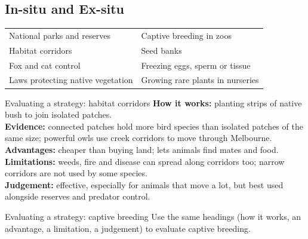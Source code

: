 \rcreset
{}

\label{theory:11}

\subsection{In-situ and Ex-situ}\label{sub:11.1}

\begin{ctab}
\begin{tabular}{|L{4.9cm}|L{4.9cm}|}
  \hline{} &  \\ \hline
  National parks and reserves & Captive breeding in zoos \\ \hline
  Habitat corridors & Seed banks \\ \hline
  Fox and cat control & Freezing eggs, sperm or tissue \\ \hline
  Laws protecting native vegetation & Growing rare plants in nurseries \\ \hline
\end{tabular}
\end{ctab}

\begin{workedex}{Evaluating a strategy: habitat corridors}
\textbf{How it works:} planting strips of native bush to join isolated patches.\\
\textbf{Evidence:} connected patches hold more bird species than isolated patches of the same size; powerful owls use creek corridors to move through Melbourne.\\
\textbf{Advantages:} cheaper than buying land; lets animals find mates and food.\\
\textbf{Limitations:} weeds, fire and disease can spread along corridors too; narrow corridors are not used by some species.\\
\textbf{Judgement:} effective, especially for animals that move a lot, but best used alongside reserves and predator control.
\end{workedex}

\begin{wedo}{Evaluating a strategy: captive breeding}
Use the same headings (how it works, an advantage, a limitation, a judgement) to evaluate captive breeding.
\answerbox{6cm}
\end{wedo}

